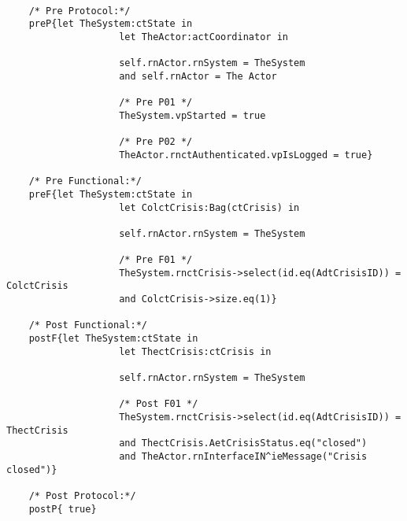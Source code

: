 	\scriptsize
	\vspace{0.5cm}
	\begin{lstlisting}[style=MessirStyle,firstnumber=auto,captionpos=b,caption={\msrmessir (MCL-oriented) specification of the operation \emph{oeCloseCrisis}.},label=OM-actCoordinator-oeCloseCrisis-MCL-LST]

	/* Pre Protocol:*/ 
	preP{let TheSystem:ctState in
					let TheActor:actCoordinator in
					
					self.rnActor.rnSystem = TheSystem
					and self.rnActor = The Actor
					
					/* Pre P01 */
					TheSystem.vpStarted = true
					
					/* Pre P02 */
					TheActor.rnctAuthenticated.vpIsLogged = true}
	
	/* Pre Functional:*/
	preF{let TheSystem:ctState in
					let ColctCrisis:Bag(ctCrisis) in
				
					self.rnActor.rnSystem = TheSystem
				
					/* Pre F01 */
					TheSystem.rnctCrisis->select(id.eq(AdtCrisisID)) = ColctCrisis
					and ColctCrisis->size.eq(1)}
	
	/* Post Functional:*/ 
	postF{let TheSystem:ctState in
					let ThectCrisis:ctCrisis in
				
					self.rnActor.rnSystem = TheSystem
				
					/* Post F01 */
					TheSystem.rnctCrisis->select(id.eq(AdtCrisisID)) = ThectCrisis
					and ThectCrisis.AetCrisisStatus.eq("closed")
					and TheActor.rnInterfaceIN^ieMessage("Crisis closed")}
	
	/* Post Protocol:*/ 
	postP{ true}
	
	\end{lstlisting}
	\normalsize 
	
	
	
	






